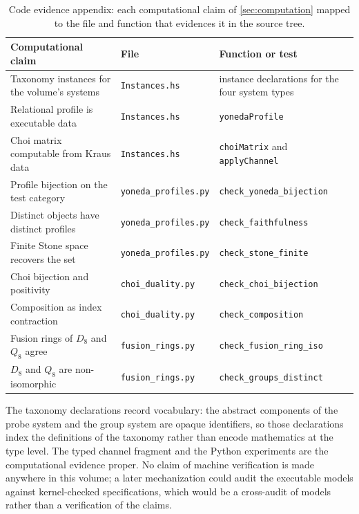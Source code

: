 \documentclass[11pt,letterpaper]{article}
\theoremstyle{definition}
\theoremstyle{remark}
\begin{document}
\begin{table}[t]
\centering
\small
\caption{Code evidence appendix: each computational claim of \cref{sec:computation} mapped to the file and function that evidences it in the source tree.}
\label{tab:code}
\begin{tabular}{@{} L{5.4cm} L{4.6cm} L{4.6cm} @{}}
\toprule
Computational claim & File & Function or test \\
\midrule
Taxonomy instances for the volume's systems & \texttt{Instances.hs} & instance declarations for the four system types \\
Relational profile is executable data & \texttt{Instances.hs} & \texttt{yonedaProfile} \\
Choi matrix computable from Kraus data & \texttt{Instances.hs} & \texttt{choiMatrix} and \texttt{applyChannel} \\
Profile bijection on the test category & \texttt{yoneda\_profiles.py} & \texttt{check\_yoneda\_bijection} \\
Distinct objects have distinct profiles & \texttt{yoneda\_profiles.py} & \texttt{check\_faithfulness} \\
Finite Stone space recovers the set & \texttt{yoneda\_profiles.py} & \texttt{check\_stone\_finite} \\
Choi bijection and positivity & \texttt{choi\_duality.py} & \texttt{check\_choi\_bijection} \\
Composition as index contraction & \texttt{choi\_duality.py} & \texttt{check\_composition} \\
Fusion rings of $D_8$ and $Q_8$ agree & \texttt{fusion\_rings.py} & \texttt{check\_fusion\_ring\_iso} \\
$D_8$ and $Q_8$ are non-isomorphic & \texttt{fusion\_rings.py} & \texttt{check\_groups\_distinct} \\
\bottomrule
\end{tabular}
\end{table}

The taxonomy declarations record vocabulary: the abstract components of the probe system and the group system are opaque identifiers, so those declarations index the definitions of the taxonomy rather than encode mathematics at the type level. The typed channel fragment and the Python experiments are the computational evidence proper. No claim of machine verification is made anywhere in this volume; a later mechanization could audit the executable models against kernel-checked specifications, which would be a cross-audit of models rather than a verification of the claims.
\end{document}

